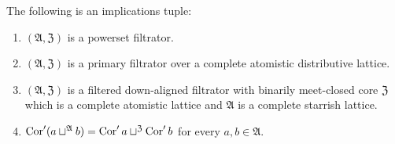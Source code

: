 \begin{thm}
\label{dual-core-join}The following is an implications tuple:
\begin{enumerate}
\item \label{dual-core-join-p}$(\mathfrak{A},\mathfrak{Z})$ is a powerset
filtrator.
\item \label{dual-core-join-f}$(\mathfrak{A},\mathfrak{Z})$ is a primary
filtrator over a complete atomistic distributive lattice.
\item \label{dual-core-join-fltr}$(\mathfrak{A},\mathfrak{Z})$ is a filtered
down-aligned filtrator with binarily meet-closed core $\mathfrak{Z}$
which is a complete atomistic lattice and $\mathfrak{A}$ is a complete
starrish lattice.
\item \label{dual-core-join-conc}$\operatorname{Cor}'(a\sqcup^{\mathfrak{A}}b)=\operatorname{Cor}'a\sqcup^{\mathfrak{Z}}\operatorname{Cor}'b$
for every $a,b\in\mathfrak{A}$.
\end{enumerate}
\end{thm}
